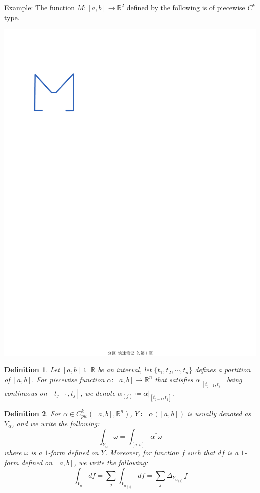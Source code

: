 \documentclass[11pt,oneside]{book}
\theoremstyle{break}
\theoremstyle{break}
\newtheorem{defn}{Definition}[corL]
\newcommand{\R}{\mathbb{R}}
\newcommand{\example}{\color{green}Example: \color{black}}
\begin{document}
\example The function $M:[a,b]\to \R^2$ defined by the following is of piecewise $C^k$ type. 
\begin{center}
\includegraphics[scale=0.5]{M.pdf}
\end{center}

\begin{defn}
Let $[a,b]\subseteq \R$ be an interval, let $\{t_1,t_2,\cdots, t_n\}$ defines a partition of $[a,b]$. For piecewise function $\alpha:[a,b]\to \R^n$ that satisfies $\alpha|_{[t_{j-1},t_j]}$ being continuous on  $[t_{j-1},t_j]$, we denote $\alpha_{(j)} \coloneqq \alpha|_{[t_{j-1},t_j]}$.
\end{defn}

\begin{defn}
For $\alpha \in C_{pw}^k([a,b],\R^n)$, $Y \coloneqq \alpha([a,b])$ is usually denoted as $Y_{\alpha}$, and we write the following:
$$\int_{Y_{\alpha}} \omega = \int_{[a,b]} \alpha^*\omega$$
where $\omega $ is a $1$-form defined on $Y$. Moreover, for function $f$ such that $df$ is a $1$-form defined on $[a,b]$, we write the following:
$$\int_{Y_\alpha} df = \sum_j \int_{Y_{\alpha_{(j)}}}df = \sum_j \Delta_{Y_{\alpha_{(j)}}} f$$  
\end{defn}
\end{document}
